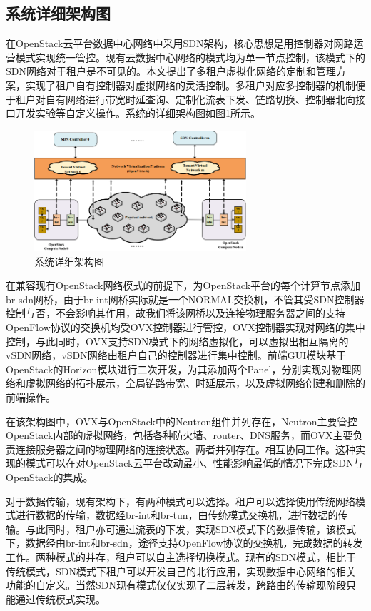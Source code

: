 \subsection{系统详细架构图}
在OpenStack云平台数据中心网络中采用SDN架构，核心思想是用控制器对网路运营模式实现统一管控。现有云数据中心网络的模式均为单一节点控制，该模式下的SDN网络对于租户是不可见的。本文提出了多租户虚拟化网络的定制和管理方案，实现了租户自有控制器对虚拟网络的灵活控制。多租户对应多控制器的机制便于租户对自有网络进行带宽时延查询、定制化流表下发、链路切换、控制器北向接口开发实验等自定义操作。系统的详细架构图如图\ref{fig:architecture}所示。

\begin{figure}[!htb]
  \centering
  \includegraphics[width=0.7\textwidth]{logo/architecture.png}
  \caption{系统详细架构图}
  \label{fig:architecture}
\end{figure}

在兼容现有OpenStack网络模式的前提下，为OpenStack平台的每个计算节点添加br-sdn网桥，由于br-int网桥实际就是一个NORMAL交换机，不管其受SDN控制器控制与否，不会影响其作用，故我们将该网桥以及连接物理服务器之间的支持OpenFlow协议的交换机均受OVX控制器进行管控，OVX控制器实现对网络的集中控制，与此同时，OVX支持SDN模式下的网络虚拟化，可以虚拟出相互隔离的vSDN网络，vSDN网络由租户自己的控制器进行集中控制。前端GUI模块基于OpenStack的Horizon模块进行二次开发，为其添加两个Panel，分别实现对物理网络和虚拟网络的拓扑展示，全局链路带宽、时延展示，以及虚拟网络创建和删除的前端操作。

在该架构图中，OVX与OpenStack中的Neutron组件并列存在，Neutron主要管控OpenStack内部的虚拟网络，包括各种防火墙、router、DNS服务，而OVX主要负责连接服务器之间的物理网络的连接状态。两者并列存在。相互协同工作。这种实现的模式可以在对OpenStack云平台改动最小、性能影响最低的情况下完成SDN与OpenStack的集成。

对于数据传输，现有架构下，有两种模式可以选择。租户可以选择使用传统网络模式进行数据的传输，数据经br-int和br-tun，由传统模式交换机，进行数据的传输。与此同时，租户亦可通过流表的下发，实现SDN模式下的数据传输，该模式下，数据经由br-int和br-sdn，途径支持OpenFlow协议的交换机，完成数据的转发工作。两种模式的并存，租户可以自主选择切换模式。现有的SDN模式，相比于传统模式，SDN模式下租户可以开发自己的北行应用，实现数据中心网络的相关功能的自定义。当然SDN现有模式仅仅实现了二层转发，跨路由的传输现阶段只能通过传统模式实现。

